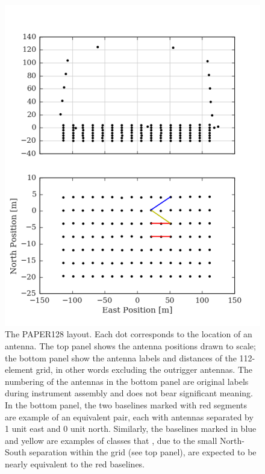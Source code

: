 \documentclass[twocolumn,apj,numberedappendix]{emulateapj}
\renewcommand\[{\begin{equation}}
\renewcommand\]{\end{equation}}
\begin{document}
\begin{figure}[H]
\includegraphics[width=\linewidth]{antconfig}

\caption{The PAPER128 layout. Each dot corresponds to the location of
an antenna. The top panel shows the antenna positions drawn to scale;
the bottom panel show the antenna labels and distances of the 112-element grid, in other words excluding the outrigger antennas.
The numbering of the antennas in the bottom panel are original labels
during instrument assembly and does not bear significant
meaning. In the bottom panel, the two baselines marked with red segments are example of an equivalent pair, each with antennas separated by 1 unit east and 0 unit north. Similarly,
the baselines marked in blue and yellow are examples
of classes that , due to the small North-South separation within the grid (see top panel), are expected to be nearly equivalent to the red baselines. }
\label{fig:AntPos}
\end{figure}
\end{document}
